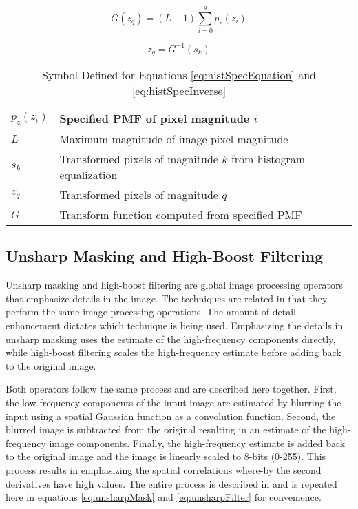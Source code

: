 \documentclass[journal]{IEEEtran}
\begin{document}
\begin{equation} \label{eq:histSpecEquation}
G(z_q) = (L-1)\sum_{i=0}^{q}p_z(z_i)
\end{equation}

\begin{equation} \label{eq:histSpecInverse}
z_q = G^{-1}(s_k)
\end{equation}

\begin{table}[h]
 \centering
 \begin{tabular}{|l|l|}
  \hline
  \(p_z(z_i)\) & Specified PMF of pixel magnitude \(i\) \\ \hline
  \(L\) & Maximum magnitude of image pixel magnitude \\ \hline
  \(s_k\) & Transformed pixels of magnitude \(k\) from histogram equalization \\ \hline
  \(z_q\) & Transformed pixels of magnitude \(q\) \\ \hline
  \(G\) & Transform function computed from specified PMF \\ \hline
 \end{tabular}
 \caption{Symbol Defined for Equations \ref{eq:histSpecEquation} and \ref{eq:histSpecInverse}}
 \label{tab:histSpecTable}
\end{table}

\subsection{Unsharp Masking and High-Boost Filtering}
Unsharp masking and high-boost filtering are global image processing operators that emphasize details in the image. The techniques are related in that they perform the same image processing operations. The amount of detail enhancement dictates which technique is being used. Emphasizing the details in unsharp masking uses the estimate of the high-frequency components directly, while high-boost filtering scales the high-frequency estimate before adding back to the original image.
\par Both operators follow the same process and are described here together. First, the low-frequency components of the input image are estimated by blurring the input using a spatial Gaussian function as a convolution function. Second, the blurred image is subtracted from the original resulting in an estimate of the high-frequency image components. Finally, the high-frequency estimate is added back to the original image and the image is linearly scaled to 8-bits (0-255). This process results in emphasizing the spatial correlations where-by the second derivatives have high values. The entire process is described in \cite[p.~162-165]{Gonzalez} and is repeated here in equations \ref{eq:unsharpMask} and \ref{eq:unsharpFilter} for convenience.
\end{document}
